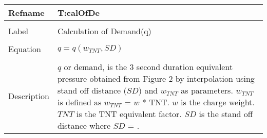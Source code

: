 \documentclass[12pt]{article}
\begin{document}
~\newline
\noindent \begin{minipage}{\textwidth}
\begin{tabular}{p{} p{}}
\toprule \textbf{Refname} & \textbf{T:calOfDe}
\label{T:calOfDe}
\\ \midrule \\
Label & Calculation of Demand(q)
\\ \midrule \\
Equation & $q=q(w_{TNT},SD)$
\\ \midrule \\
Description & $q$ or demand, is the 3 second duration equivalent pressure obtained from Figure 2 by interpolation using stand off distance ($SD$) and $w_{TNT}$ as parameters. $w_{TNT}$ is defined as $w_{TNT}$ = $w$ * TNT. $w$ is the charge weight. $TNT$ is the TNT equivalent factor. $SD$ is the stand off distance where $SD$ = .
\\ \bottomrule \end{tabular}
\end{minipage}\\
\end{document}
